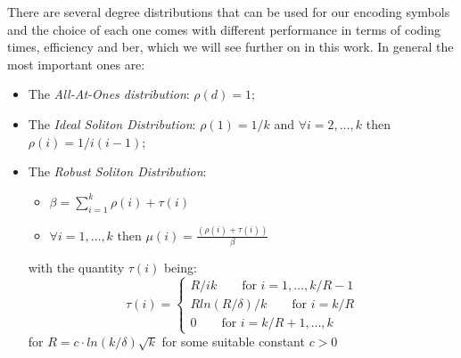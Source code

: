 There are several degree distributions that can be used for our encoding symbols and the choice of each one comes with different performance in terms of coding times, efficiency and \gls{ber}, which we will see further on in this work. In general the most important ones are:
\begin{itemize}
  \item The \textit{All-At-Ones distribution}: $\rho(d) = 1$;
  \item The \textit{Ideal Soliton Distribution}: $\rho(1) = 1/k$ and $\forall i = 2,\dots,k$ then $\rho(i) = 1/i(i-1)$;
  \item The \textit{Robust Soliton Distribution}:
  \begin{itemize}
    \item $\beta  = \sum_{i=1}^{k}\rho(i)+\tau(i)$
    \item $\forall i = 1,\dots,k$ then $\mu(i) = \frac{(\rho(i)+\tau(i))}{\beta}$
  \end{itemize}
  with the quantity $\tau(i)$ being:\\
  \[
  \tau(i) =
  \begin{cases}
    R/ik \qquad \text{for } i = 1,\dots,k/R-1\\
    Rln(R/\delta)/k \qquad \text{for } i = k/R\\
    0 \qquad \text{for } i = k/R +1, \dots,k
  \end{cases}
  \]
  for $R = c\cdot ln(k/\delta)\sqrt k$ for some suitable constant $c > 0$
\end{itemize}
